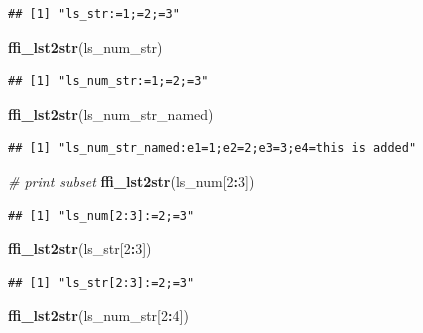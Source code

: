 \documentclass[
]{book}
\newenvironment{Shaded}{\begin{snugshade}}{\end{snugshade}}
\newcommand{\CommentTok}[1]{\textcolor[rgb]{0.56,0.35,0.01}{\textit{#1}}}
\newcommand{\DecValTok}[1]{\textcolor[rgb]{0.00,0.00,0.81}{#1}}
\newcommand{\KeywordTok}[1]{\textcolor[rgb]{0.13,0.29,0.53}{\textbf{#1}}}
\newcommand{\NormalTok}[1]{#1}
\newcommand{\OperatorTok}[1]{\textcolor[rgb]{0.81,0.36,0.00}{\textbf{#1}}}
\begin{document}
\begin{verbatim}
## [1] "ls_str:=1;=2;=3"
\end{verbatim}

\begin{Shaded}
\begin{Highlighting}[]
\KeywordTok{ffi\_lst2str}\NormalTok{(ls\_num\_str)}
\end{Highlighting}
\end{Shaded}

\begin{verbatim}
## [1] "ls_num_str:=1;=2;=3"
\end{verbatim}

\begin{Shaded}
\begin{Highlighting}[]
\KeywordTok{ffi\_lst2str}\NormalTok{(ls\_num\_str\_named)}
\end{Highlighting}
\end{Shaded}

\begin{verbatim}
## [1] "ls_num_str_named:e1=1;e2=2;e3=3;e4=this is added"
\end{verbatim}

\begin{Shaded}
\begin{Highlighting}[]
\CommentTok{\# print subset}
\KeywordTok{ffi\_lst2str}\NormalTok{(ls\_num[}\DecValTok{2}\OperatorTok{:}\DecValTok{3}\NormalTok{])}
\end{Highlighting}
\end{Shaded}

\begin{verbatim}
## [1] "ls_num[2:3]:=2;=3"
\end{verbatim}

\begin{Shaded}
\begin{Highlighting}[]
\KeywordTok{ffi\_lst2str}\NormalTok{(ls\_str[}\DecValTok{2}\OperatorTok{:}\DecValTok{3}\NormalTok{])}
\end{Highlighting}
\end{Shaded}

\begin{verbatim}
## [1] "ls_str[2:3]:=2;=3"
\end{verbatim}

\begin{Shaded}
\begin{Highlighting}[]
\KeywordTok{ffi\_lst2str}\NormalTok{(ls\_num\_str[}\DecValTok{2}\OperatorTok{:}\DecValTok{4}\NormalTok{])}
\end{Highlighting}
\end{Shaded}
\end{document}
